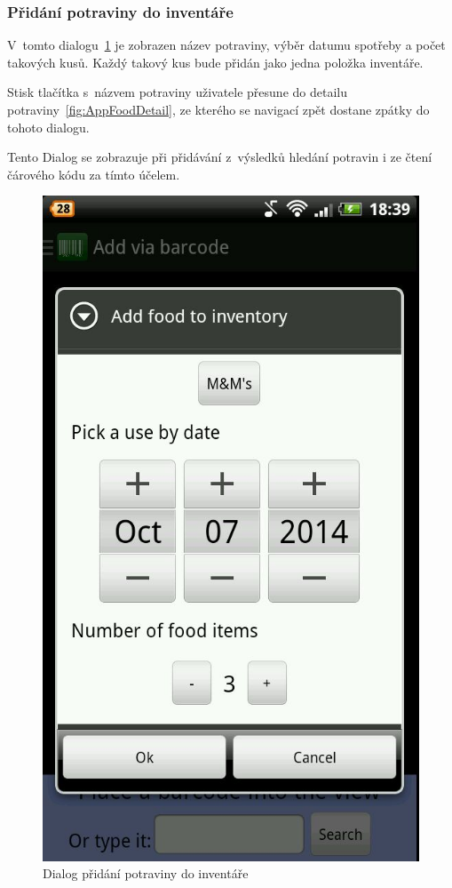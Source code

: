 \documentclass[thesis=B,czech]{FITthesis}[2013/10/20]
\begin{document}
\clearpage

\subsubsection{Přidání potraviny do inventáře}

V~tomto dialogu~\ref{fig:AppScanAddFood} je zobrazen název potraviny, výběr datumu spotřeby a počet takových kusů. Každý takový kus bude přidán jako jedna položka inventáře.

Stisk tlačítka s~názvem potraviny uživatele přesune do detailu potraviny~\ref{fig:AppFoodDetail}, ze kterého se navigací zpět dostane zpátky do tohoto dialogu.

Tento Dialog se zobrazuje při přidávání z~výsledků hledání potravin i ze čtení čárového kódu za tímto účelem.

\begin{figure}[H]
  \centering
  \includegraphics[scale=0.4]{screenshots/app_scan_add_food.jpg}
  \caption{Dialog přidání potraviny do inventáře}
  \label{fig:AppScanAddFood}
\end{figure}
\end{document}
